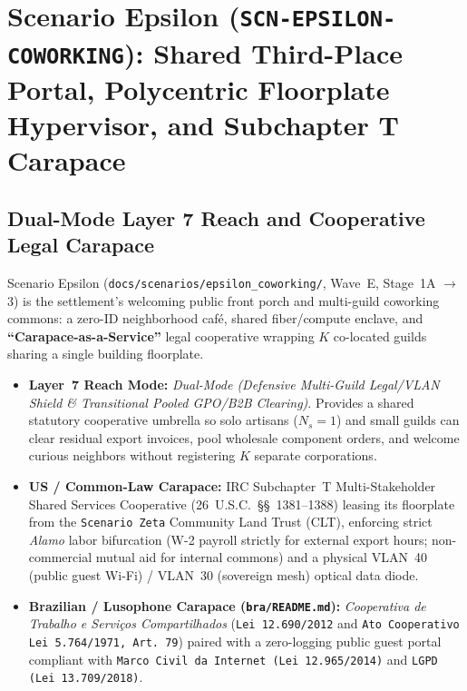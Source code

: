 \chapter{Scenario Epsilon (\texttt{SCN-EPSILON-COWORKING}): Shared Third-Place Portal, Polycentric Floorplate Hypervisor, and Subchapter T Carapace}
\label{app:scenario-epsilon}

\section{Dual-Mode Layer 7 Reach and Cooperative Legal Carapace}
Scenario Epsilon (\texttt{docs/scenarios/epsilon\_coworking/}, Wave~E, Stage~1A $\to$ 3) is the settlement's welcoming public front porch and multi-guild coworking commons: a zero-ID neighborhood café, shared fiber/compute enclave, and \textbf{``Carapace-as-a-Service''} legal cooperative wrapping $K$ co-located guilds sharing a single building floorplate.
\begin{itemize}
    \item \textbf{Layer~7 Reach Mode:} \textit{Dual-Mode (Defensive Multi-Guild Legal/VLAN Shield \& Transitional Pooled GPO/B2B Clearing)}. Provides a shared statutory cooperative umbrella so solo artisans ($N_s = 1$) and small guilds can clear residual export invoices, pool wholesale component orders, and welcome curious neighbors without registering $K$ separate corporations.
    \item \textbf{US / Common-Law Carapace:} IRC Subchapter~T Multi-Stakeholder Shared Services Cooperative (26~U.S.C.~\S\S~1381--1388) leasing its floorplate from the \texttt{Scenario Zeta} Community Land Trust (CLT), enforcing strict \textit{Alamo} labor bifurcation (W-2 payroll strictly for external export hours; non-commercial mutual aid for internal commons) and a physical VLAN~40 (public guest Wi-Fi) / VLAN~30 (sovereign mesh) optical data diode.
    \item \textbf{Brazilian / Lusophone Carapace (\texttt{bra/README.md}):} \textit{Cooperativa de Trabalho e Servi{\c{c}}os Compartilhados} (\texttt{Lei 12.690/2012} and \texttt{Ato Cooperativo Lei 5.764/1971, Art.~79}) paired with a zero-logging public guest portal compliant with \texttt{Marco Civil da Internet (Lei 12.965/2014)} and \texttt{LGPD (Lei 13.709/2018)}.
\end{itemize}

